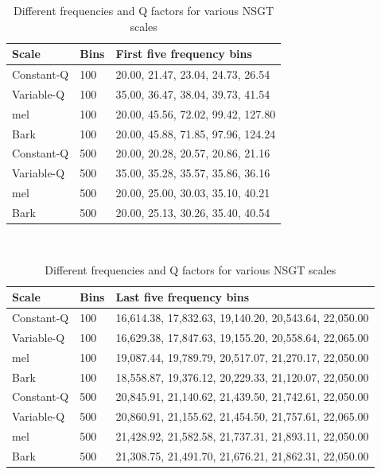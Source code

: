 \documentclass[report.tex]{subfiles}
\begin{document}
\begin{table}[ht]
	\centering
	\caption{Different frequencies and Q factors for various NSGT scales}
	\label{table:nsgtfreqsandqs}
\begin{tabular}{ |l|l|p{10cm}| }
	 \hline
	 Scale & Bins & First five frequency bins \\
	 \hline
	 \hline
	 Constant-Q & 100 & 20.00, 21.47, 23.04, 24.73, 26.54 \\
	 \hline
	 Variable-Q & 100 & 35.00, 36.47, 38.04, 39.73, 41.54 \\
	 \hline
	 mel & 100 & 20.00, 45.56, 72.02, 99.42, 127.80 \\
	 \hline
	 Bark & 100 & 20.00, 45.88, 71.85, 97.96, 124.24 \\
	 \hline
	 Constant-Q & 500 & 20.00, 20.28, 20.57, 20.86, 21.16 \\
	 \hline
	 Variable-Q & 500 & 35.00, 35.28, 35.57, 35.86, 36.16 \\
	 \hline
	 mel & 500 & 20.00, 25.00, 30.03, 35.10, 40.21 \\
	 \hline
	 Bark & 500 & 20.00, 25.13, 30.26, 35.40, 40.54 \\
	 \hline
\end{tabular}\\
\vspace{1em}
\begin{tabular}{ |l|l|p{10cm}| }
	 \hline
	 Scale & Bins & Last five frequency bins \\
	 \hline
	 \hline
	 Constant-Q & 100 & 16,614.38, 17,832.63, 19,140.20, 20,543.64, 22,050.00 \\
	 \hline
	 Variable-Q & 100 & 16,629.38, 17,847.63, 19,155.20, 20,558.64, 22,065.00 \\
	 \hline
	 mel & 100 & 19,087.44, 19,789.79, 20,517.07, 21,270.17, 22,050.00 \\
	 \hline
	 Bark & 100 & 18,558.87, 19,376.12, 20,229.33, 21,120.07, 22,050.00 \\
	 \hline
	 Constant-Q & 500 & 20,845.91, 21,140.62, 21,439.50, 21,742.61, 22,050.00 \\
	 \hline
	 Variable-Q & 500 & 20,860.91, 21,155.62, 21,454.50, 21,757.61, 22,065.00 \\
	 \hline
	 mel & 500 & 21,428.92, 21,582.58, 21,737.31, 21,893.11, 22,050.00 \\
	 \hline
	 Bark & 500 & 21,308.75, 21,491.70, 21,676.21, 21,862.31, 22,050.00 \\
	 \hline
\end{tabular}\\

\end{table}
\end{document}

